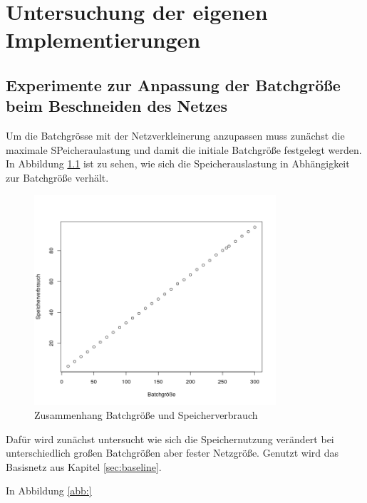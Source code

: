 \chapter{Untersuchung der eigenen Implementierungen}
\section{Experimente zur Anpassung der Batchgröße beim Beschneiden des Netzes}\label{sec:ptnew}
Um die Batchgrösse mit der Netzverkleinerung anzupassen muss zunächst die maximale SPeicheraulastung und damit die initiale Batchgröße festgelegt werden. In Abbildung \ref{abb:memory1} ist zu sehen, wie sich die Speicherauslastung in Abhängigkeit zur Batchgröße verhält.

\begin{figure}[h]
 \centering
 \includegraphics[width=0.8\textwidth]{KapitelPartB/Images/memory1.png}
 \caption{Zusammenhang Batchgröße und Speicherverbrauch}
 \label{abb:memory1}
\end{figure}




Dafür wird zunächst untersucht wie sich die Speichernutzung verändert bei unterschiedlich großen Batchgrößen aber fester Netzgröße. Genutzt wird das Basisnetz aus Kapitel \ref{sec:baseline}. 

In Abbildung \ref{abb:}




